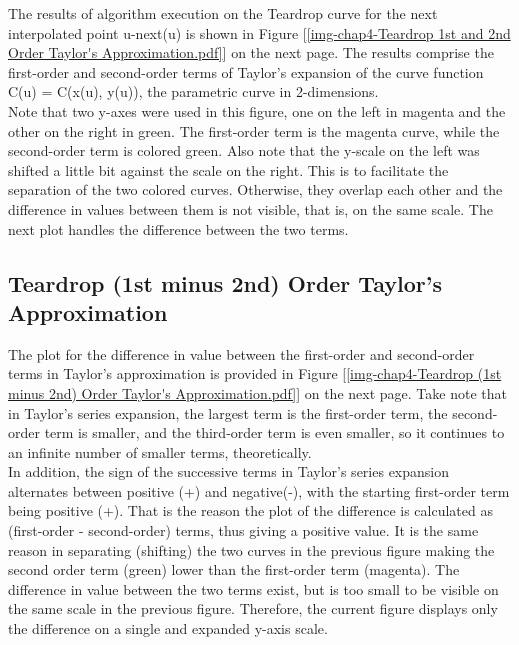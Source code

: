 The results of algorithm execution on the Teardrop curve for the next interpolated point u-next(u) is shown in Figure [\ref  {img-chap4-Teardrop 1st and 2nd Order Taylor's Approximation.pdf}] on the next page. The results comprise the first-order and second-order terms of Taylor's expansion of the curve function C(u) = C(x(u), y(u)), the parametric curve in 2-dimensions. \\

Note that two y-axes were used in this figure, one on the left in magenta and the other on the right in green. The first-order term is the magenta curve, while the second-order term is colored green. Also note that the y-scale on the left was shifted a little bit against the scale on the right. This is to facilitate the separation of the two colored curves. Otherwise, they overlap each other and the difference in values between them is not visible, that is, on the same scale. The next plot handles the difference between the two terms.


\subsection{Teardrop (1st minus 2nd) Order Taylor's Approximation} 
\label{ssec-chap4-Teardrop (1st minus 2nd) Order Taylor's Approximation}

The plot for the difference in value between the first-order and second-order terms in Taylor's approximation is provided in Figure [\ref{img-chap4-Teardrop (1st minus 2nd) Order Taylor's Approximation.pdf}] on the next page. Take note that in Taylor's series expansion, the largest term is the first-order term, the second-order term is smaller, and the third-order term is even smaller, so it continues to an infinite number of smaller terms, theoretically. \\

In addition, the sign of the successive terms in Taylor's series expansion alternates between positive (+) and negative(-), with the starting first-order term being positive (+). That is the reason the plot of the difference is calculated as (first-order - second-order) terms, thus giving a positive value. It is the same reason in separating (shifting) the two curves in the previous figure making the second order term (green) lower than the first-order term (magenta). The difference in value between the two terms exist, but is too small to be visible on the same scale in the previous figure. Therefore, the current figure displays only the difference on a single and expanded y-axis scale.  



